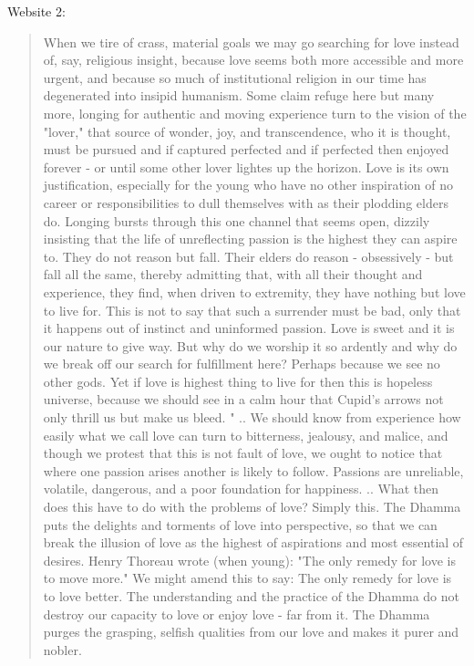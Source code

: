 \documentclass[10pt]{book}
\begin{document}
Website 2:
\begin{quotation}
When we tire of crass, material goals we may go searching for love instead of, say, religious insight, because love seems both more accessible and more urgent, and because so much of institutional religion in our time has degenerated into insipid humanism. Some claim refuge here but many more, longing for authentic and moving experience turn to the vision of the "lover," that source of wonder, joy, and transcendence, who it is thought, must be pursued and if captured perfected and if perfected then enjoyed forever - or until some other lover lightes up the horizon. Love is its own justification, especially for the young who have no other inspiration of no career or responsibilities to dull themselves with as their plodding elders do. Longing bursts through this one channel that seems open, dizzily insisting that the life of unreflecting passion is the highest they can aspire to. They do not reason but fall. Their elders do reason - obsessively - but fall all the same, thereby admitting that, with all their thought and experience, they find, when driven to extremity, they have nothing but love to live for.
This is not to say that such a surrender must be bad, only that it happens out of instinct and uninformed passion. Love is sweet and it is our nature to give way. But why do we worship it so ardently and why do we break off our search for fulfillment here? Perhaps because we see no other gods. Yet if love is highest thing to live for then this is hopeless universe, because we should see in a calm hour that Cupid's arrows not only thrill us but make us bleed.
"
.. We should know from experience how easily what we call love can turn to bitterness, jealousy, and malice, and though we protest that this is not fault of love, we ought to notice that where one passion arises another is likely to follow. Passions are unreliable, volatile, dangerous, and a poor foundation for happiness.
.. What then does this have to do with the problems of love? Simply this. The Dhamma puts the delights and torments of love into perspective, so that we can break the illusion of love as the highest of aspirations and most essential of desires. Henry Thoreau wrote (when young): "The only remedy for love is to move more." We might amend this to say: The only remedy for love is to love better. The understanding and the practice of the Dhamma do not destroy our capacity to love or enjoy love - far from it. The Dhamma purges the grasping, selfish qualities from our love and makes it purer and nobler.

\end{quotation}
\end{document}
